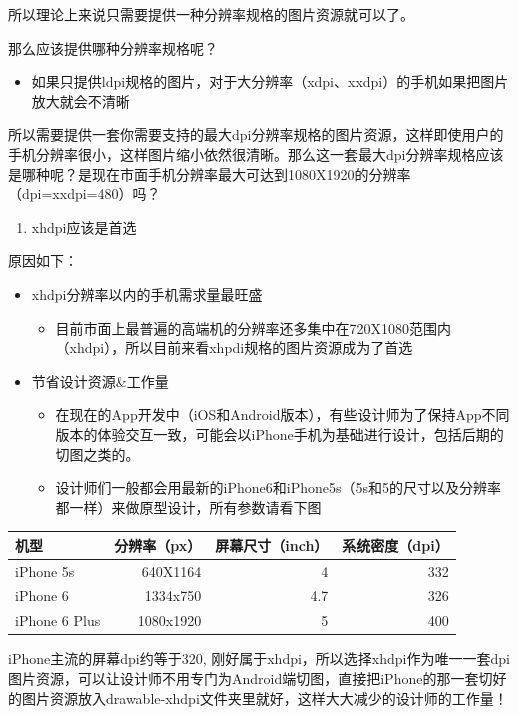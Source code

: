 \documentclass[9pt, b5paper]{article}
\begin{document}
\begin{enumerate}
所以理论上来说只需要提供一种分辨率规格的图片资源就可以了。

那么应该提供哪种分辨率规格呢？
\begin{itemize}
\item 如果只提供ldpi规格的图片，对于大分辨率（xdpi、xxdpi）的手机如果把图片放大就会不清晰
\end{itemize}

所以需要提供一套你需要支持的最大dpi分辨率规格的图片资源，这样即使用户的手机分辨率很小，这样图片缩小依然很清晰。那么这一套最大dpi分辨率规格应该是哪种呢？是现在市面手机分辨率最大可达到1080X1920的分辨率（dpi=xxdpi=480）吗？

\begin{enumerate}
\item xhdpi应该是首选
\end{enumerate}

原因如下：
\begin{itemize}
\item xhdpi分辨率以内的手机需求量最旺盛
\begin{itemize}
\item 目前市面上最普遍的高端机的分辨率还多集中在720X1080范围内（xhdpi），所以目前来看xhpdi规格的图片资源成为了首选
\end{itemize}
\item 节省设计资源\&工作量
\begin{itemize}
\item 在现在的App开发中（iOS和Android版本），有些设计师为了保持App不同版本的体验交互一致，可能会以iPhone手机为基础进行设计，包括后期的切图之类的。
\item 设计师们一般都会用最新的iPhone6和iPhone5s（5s和5的尺寸以及分辨率都一样）来做原型设计，所有参数请看下图
\end{itemize}
\end{itemize}
\begin{center}
\begin{tabular}{lrrr}
\hline
机型 & 分辨率（px） & 屏幕尺寸（inch） & 系统密度（dpi）\\
\hline
iPhone 5s & 640X1164 & 4 & 332\\
iPhone 6 & 1334x750 & 4.7 & 326\\
iPhone 6 Plus & 1080x1920 & 5 & 400\\
\hline
\end{tabular}
\end{center}

iPhone主流的屏幕dpi约等于320, 刚好属于xhdpi，所以选择xhdpi作为唯一一套dpi图片资源，可以让设计师不用专门为Android端切图，直接把iPhone的那一套切好的图片资源放入drawable-xhdpi文件夹里就好，这样大大减少的设计师的工作量！


\end{enumerate}
\end{document}
